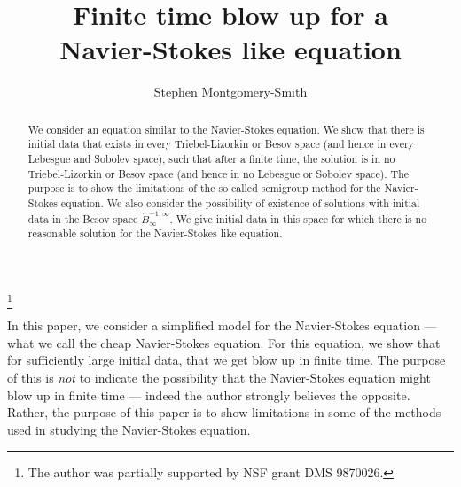 \documentclass[12pt]{amsart}
\begin{document}
\title[Finite time blow up for a Navier-Stokes like equation]
{Finite time blow up for a\\
Navier-Stokes like equation
}

\author{Stephen Montgomery-Smith}
\makeatletter
\address{Department of Mathematics\\
University of Missouri\\
Columbia, MO 65211}
\thanks{The author was 
partially supported
by NSF grant DMS 9870026.}

\begin{abstract}
\noindent
We consider an equation similar to the Navier-Stokes equation.  
We show that
there is initial data that exists in every Triebel-Lizorkin or Besov space
(and hence in every Lebesgue and Sobolev space), such that after a finite
time, the solution
is in no Triebel-Lizorkin or Besov space (and hence 
in no Lebesgue or Sobolev space).  The purpose is to show the
limitations of the so called semigroup method for the Navier-Stokes
equation.
We also consider the possibility of existence of
solutions with initial data in the Besov space $\dot B^{-1,\infty}_\infty$.
We give initial data in this space for which there is no reasonable
solution for the Navier-Stokes like equation.
\end{abstract}

\maketitle

In this paper, we consider a simplified model for the 
Navier-Stokes equation --- what we call the cheap Navier-Stokes
equation.  For this equation, we show that for sufficiently
large initial data, that we get blow up in finite time.  
The purpose of this is {\em not\/} to indicate the 
possibility that the Navier-Stokes equation might blow up
in finite time --- indeed the author strongly believes
the opposite.  Rather, the purpose of this paper is to show limitations
in some of the methods used in studying the Navier-Stokes
equation.
\end{document}
